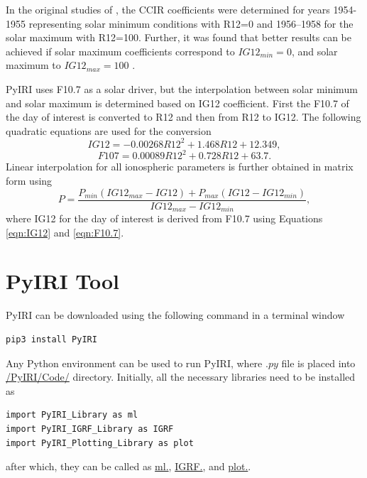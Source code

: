 \documentclass[draft]{agujournal2019}
\begin{document}
In the original studies of , the CCIR coefficients were determined for years 1954-1955 representing solar minimum conditions with R12=0 and 1956–1958 for the solar maximum with R12=100. Further, it was found that better results can be achieved if solar maximum coefficients correspond to $IG12_{min}=0$, and solar maximum to $IG12_{max}=100$ \cite{Liu83, Liu09, Ma09}. 

PyIRI uses F10.7 as a solar driver, but the interpolation between solar minimum and solar maximum is determined based on IG12 coefficient. First the F10.7 of the day of interest is converted to R12 and then from R12 to IG12. The following quadratic equations are used for the conversion
\begin{equation}\label{eqn:IG12}
IG12=-0.00268R12^2+1.468R12+12.349,
\end{equation}
\begin{equation}\label{eqn:F10.7}
F107=0.00089R12^2+0.728R12+63.7.
\end{equation}
Linear interpolation for all ionospheric parameters is further obtained in matrix form using
\begin{equation}\label{eqn:interpolation}
P=\frac{P_{min}(IG12_{max}-IG12)+P_{max}(IG12-IG12_{min})}{IG12_{max}-IG12_{min}},
\end{equation}
where IG12 for the day of interest is derived from F10.7 using Equations \ref{eqn:IG12} and \ref{eqn:F10.7}.

\section{PyIRI Tool}
PyIRI can be downloaded using the following command in a terminal window
\begin{verbatim}
pip3 install PyIRI
\end{verbatim}

Any Python environment can be used to run PyIRI, where $.py$ file is placed into \url{/PyIRI/Code/} directory. Initially, all the necessary libraries need to be installed as
\begin{verbatim}
import PyIRI_Library as ml
import PyIRI_IGRF_Library as IGRF
import PyIRI_Plotting_Library as plot
\end{verbatim}
after which, they can be called as \url{ml.}, \url{IGRF.}, and \url{plot.}.
\end{document}
